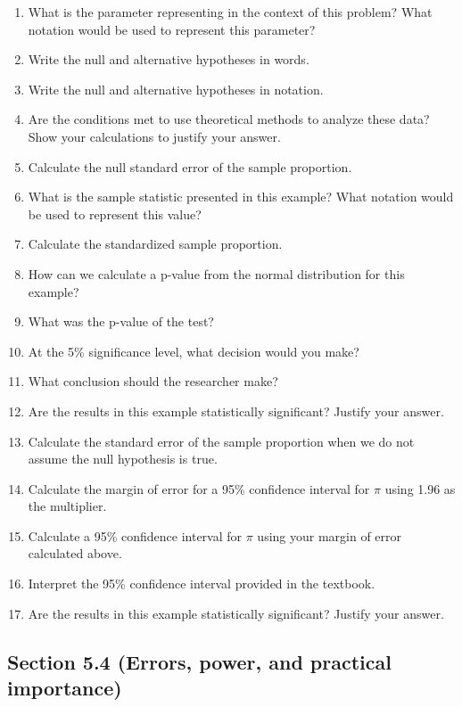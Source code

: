 \documentclass[
]{report}
\newcommand{\rgs}{\vspace{12pt}} %
\begin{document}
\begin{enumerate}
\def\labelenumi{\arabic{enumi}.}
\item
  What is the parameter representing in the context of this problem? What notation would be used to represent this parameter?
  \rgs
  \rgs
\item
  Write the null and alternative hypotheses in words.
  \rgs
  \rgs
\item
  Write the null and alternative hypotheses in notation.
  \rgs
\item
  Are the conditions met to use theoretical methods to analyze these data? Show your calculations to justify your answer.
  \rgs
  \rgs
\item
  Calculate the null standard error of the sample proportion.
  \rgs
  \rgs
\item
  What is the sample statistic presented in this example? What notation would be used to represent this value?
  \rgs
\item
  Calculate the standardized sample proportion.
  \rgs
  \rgs
\item
  How can we calculate a p-value from the normal distribution for this example?
  \rgs
  \rgs
\item
  What was the p-value of the test?
  \rgs
\item
  At the 5\% significance level, what decision would you make?
  \rgs
\item
  What conclusion should the researcher make?
  \rgs
  \rgs
\item
  Are the results in this example statistically significant? Justify your answer.
  \rgs
\item
  Calculate the standard error of the sample proportion when we do not assume the null hypothesis is true.
  \rgs
  \rgs
\item
  Calculate the margin of error for a 95\% confidence interval for \(\pi\) using 1.96 as the multiplier.
  \rgs
  \rgs
\item
  Calculate a 95\% confidence interval for \(\pi\) using your margin of error calculated above.
  \rgs
  \rgs
\item
  Interpret the 95\% confidence interval provided in the textbook.
  \rgs
  \rgs
\item
  Are the results in this example statistically significant? Justify your answer.
  \rgs
\end{enumerate}

\hypertarget{section-5.4-errors-power-and-practical-importance}{%
\subsection*{Section 5.4 (Errors, power, and practical importance)}\label{section-5.4-errors-power-and-practical-importance}}
\end{document}
